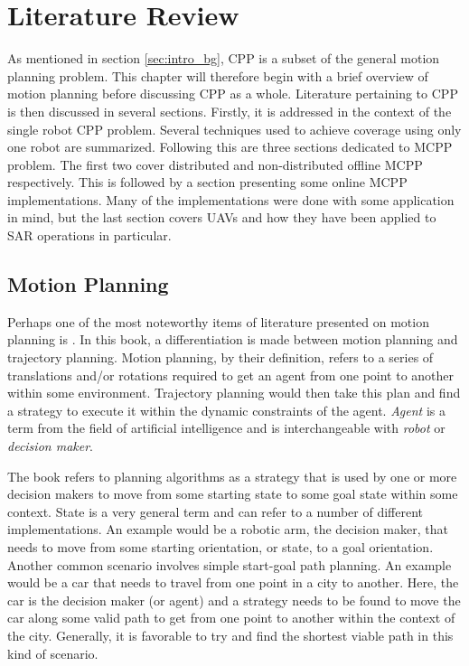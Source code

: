 \chapter{Literature Review}
\label{chp:back}
As mentioned in section \ref{sec:intro_bg}, \acl{CPP} is a subset of the general motion planning problem. This chapter will therefore begin with a brief overview of motion planning before discussing \acs{CPP} as a whole. Literature pertaining to \acs{CPP} is then discussed in several sections. Firstly, it is addressed in the context of the single robot \acs{CPP} problem. Several techniques used to achieve coverage using only one robot are summarized. Following this are three sections dedicated to \acf{MCPP} problem. The first two cover distributed and non-distributed offline \acs{MCPP} respectively. This is followed by a section presenting some online \acs{MCPP} implementations. Many of the implementations were done with some application in mind, but the last section covers \acsp{UAV} and how they have been applied to \acs{SAR} operations in particular.

\section{Motion Planning}
Perhaps one of the most noteworthy items of literature presented on motion planning is \cite{Lavalle2006}. In this book, a differentiation is made between motion planning and trajectory planning. Motion planning, by their definition, refers to a series of translations and/or rotations required to get an agent from one point to another within some environment. Trajectory planning would then take this plan and find a strategy to execute it within the dynamic constraints of the agent. \emph{Agent} is a term from the field of artificial intelligence and is interchangeable with \emph{robot} or \emph{decision maker}.

The book refers to planning algorithms as a strategy that is used by one or more decision makers to move from some starting state to some goal state within some context. State is a very general term and can refer to a number of different implementations. An example would be a robotic arm, the decision maker, that needs to move from some starting orientation, or state, to a goal orientation. Another common scenario involves simple start-goal path planning. An example would be a car that needs to travel from one point in a city to another. Here, the car is the decision maker (or agent) and a strategy needs to be found to move the car along some valid path to get from one point to another within the context of the city. Generally, it is favorable to try and find the shortest viable path in this kind of scenario.

